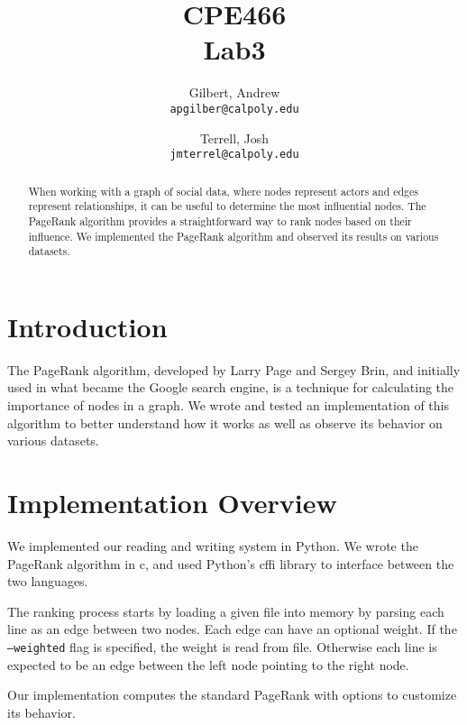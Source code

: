\documentclass{report}
\title{CPE466\\Lab3}
\author{
  Gilbert, Andrew\\
  \texttt{apgilber@calpoly.edu}
  \and
  Terrell, Josh\\
  \texttt{jmterrel@calpoly.edu}
}
\date{}
\begin{document}
\maketitle

\begin{abstract}
When working with a graph of social data, where nodes represent actors and edges
represent relationships, it can be useful to determine the most influential
nodes. The PageRank algorithm provides a straightforward way to rank nodes based
on their influence. We implemented the PageRank algorithm and observed its
results on various datasets.
\end{abstract}

\section{Introduction}
The PageRank algorithm, developed by Larry Page and Sergey Brin, and initially
used in what became the Google search engine, is a technique for calculating the
importance of nodes in a graph. We wrote and tested an implementation of this
algorithm to better understand how it works as well as observe its behavior on
various datasets.

\section{Implementation Overview}
We implemented our reading and writing system in Python. We wrote the
PageRank algorithm in c, and used Python's cffi library to interface between
the two languages.

The ranking process starts by loading a given file into memory by parsing each
line as an edge between two nodes. Each edge can have an optional weight. If the
\texttt{--weighted} flag is specified, the weight is read from file. Otherwise
each line is expected to be an edge between the left node pointing to the right
node.

Our implementation computes the standard PageRank with options to customize its
behavior. 
\end{document}
